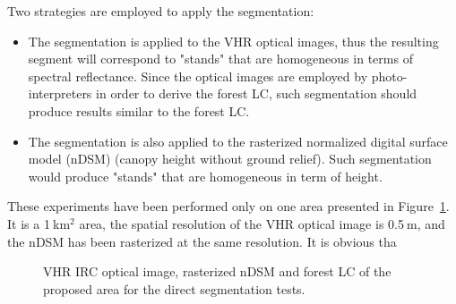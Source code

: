 Two strategies are employed to apply the segmentation:
\begin{itemize}
\item The segmentation is applied to the VHR optical images, thus the resulting segment will correspond to "stands" that are homogeneous in terms of spectral reflectance. Since the optical images are employed by photo-interpreters in order to derive the forest LC, such segmentation should produce results similar to the forest LC.
\item The segmentation is also applied to the rasterized normalized digital surface model (nDSM) (canopy height without ground relief). Such segmentation would produce "stands" that are homogeneous in term of height.
\end{itemize}

These experiments have been performed only on one area presented in Figure~\ref{fig:data_direct_seg}. It is a 1$\:$km$^{2}$ area, the spatial resolution of the VHR optical image is 0.5$\:$m, and the nDSM has been rasterized at the same resolution. It is obvious tha

\begin{figure}[htbp]
\begin{center}
\begingroup
\captionsetup[subfigure]{width=0.16\textwidth}
\endgroup
\caption{VHR IRC optical image, rasterized nDSM and forest LC of the proposed area for the direct segmentation tests.}
\label{fig:data_direct_seg}
\end{center}
\end{figure}

